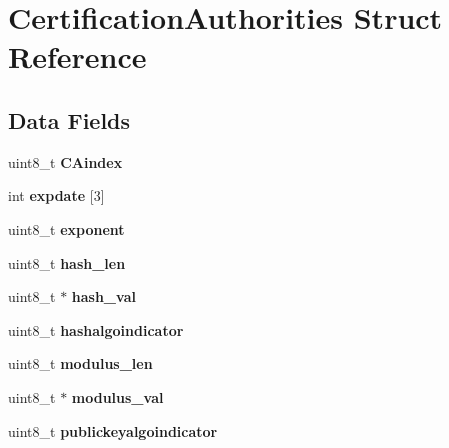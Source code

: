 \hypertarget{struct_certification_authorities}{}\section{Certification\+Authorities Struct Reference}
\label{struct_certification_authorities}
\subsection*{Data Fields}
\begin{DoxyCompactItemize}
\item
\hypertarget{struct_certification_authorities_a9414fe6ffc23bcd6aecf04b73815de4c}{}\label{struct_certification_authorities_a9414fe6ffc23bcd6aecf04b73815de4c}
uint8\+\_\+t {\bfseries C\+Aindex}
\item
\hypertarget{struct_certification_authorities_a74db2d4c720927689793d17e8f7aa201}{}\label{struct_certification_authorities_a74db2d4c720927689793d17e8f7aa201}
int {\bfseries expdate} \mbox{[}3\mbox{]}
\item
\hypertarget{struct_certification_authorities_af05d5abe7656953548edfb3eb5117659}{}\label{struct_certification_authorities_af05d5abe7656953548edfb3eb5117659}
uint8\+\_\+t {\bfseries exponent}
\item
\hypertarget{struct_certification_authorities_a759b7e96d51c83032b1b2b3b044c603b}{}\label{struct_certification_authorities_a759b7e96d51c83032b1b2b3b044c603b}
uint8\+\_\+t {\bfseries hash\+\_\+len}
\item
\hypertarget{struct_certification_authorities_a0e534707786c3202ce6e8b7e0e09fcfc}{}\label{struct_certification_authorities_a0e534707786c3202ce6e8b7e0e09fcfc}
uint8\+\_\+t $\ast$ {\bfseries hash\+\_\+val}
\item
\hypertarget{struct_certification_authorities_acb88a5708b7b7b661cbf957c102af84d}{}\label{struct_certification_authorities_acb88a5708b7b7b661cbf957c102af84d}
uint8\+\_\+t {\bfseries hashalgoindicator}
\item
\hypertarget{struct_certification_authorities_a284a4fa5e7ccf25f33e813d99e72e1e0}{}\label{struct_certification_authorities_a284a4fa5e7ccf25f33e813d99e72e1e0}
uint8\+\_\+t {\bfseries modulus\+\_\+len}
\item
\hypertarget{struct_certification_authorities_ababec13341cbe30053f9f6b21de153e9}{}\label{struct_certification_authorities_ababec13341cbe30053f9f6b21de153e9}
uint8\+\_\+t $\ast$ {\bfseries modulus\+\_\+val}
\item
\hypertarget{struct_certification_authorities_a3a073291e447e9d7472092cb8d2d2e26}{}\label{struct_certification_authorities_a3a073291e447e9d7472092cb8d2d2e26}
uint8\+\_\+t {\bfseries publickeyalgoindicator}
\end{DoxyCompactItemize}


